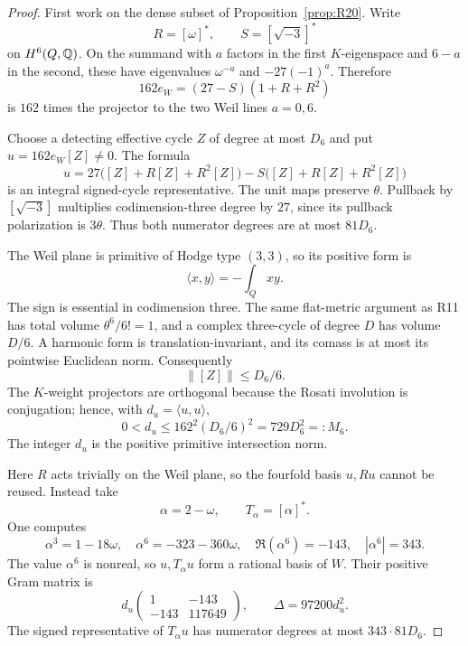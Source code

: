 \begin{proof}
First work on the dense subset of Proposition~\ref{prop:R20}. Write
\[
R=[\omega]^*,\qquad S=[\sqrt{-3}]^*
\]
on $H^6(Q,\mathbb Q)$. On the summand with $a$ factors in the first $K$-eigenspace and $6-a$ in the second, these have eigenvalues $\omega^{-a}$ and $-27(-1)^a$. Therefore
\begin{equation}
162e_W=(27-S)(1+R+R^2)
\label{eq:sixfold-projector}
\end{equation}
is $162$ times the projector to the two Weil lines $a=0,6$.

Choose a detecting effective cycle $Z$ of degree at most $D_6$ and put $u=162e_W[Z]\ne0$. The formula
\[
u=27\bigl([Z]+R[Z]+R^2[Z]\bigr)
-S\bigl([Z]+R[Z]+R^2[Z]\bigr)
\]
is an integral signed-cycle representative. The unit maps preserve $\theta$. Pullback by $[\sqrt{-3}]$ multiplies codimension-three degree by $27$, since its pullback polarization is $3\theta$. Thus both numerator degrees are at most $81D_6$.

The Weil plane is primitive of Hodge type $(3,3)$, so its positive form is
\[
\langle x,y\rangle=-\int_Qxy.
\]
The sign is essential in codimension three. The same flat-metric argument as R11 has total volume $\theta^6/6!=1$, and a complex three-cycle of degree $D$ has volume $D/6$. A harmonic form is translation-invariant, and its comass is at most its pointwise Euclidean norm. Consequently
\[
\|[Z]\|\leq D_6/6.
\]
The $K$-weight projectors are orthogonal because the Rosati involution is conjugation; hence, with $d_u=\langle u,u\rangle$,
\begin{equation}
0<d_u\leq162^2(D_6/6)^2=729D_6^2=:M_6.
\label{eq:M6}
\end{equation}
The integer $d_u$ is the positive primitive intersection norm.

Here $R$ acts trivially on the Weil plane, so the fourfold basis $u,Ru$ cannot be reused. Instead take
\[
\alpha=2-\omega,\qquad T_\alpha=[\alpha]^*.
\]
One computes
\[
\alpha^3=1-18\omega,\quad
\alpha^6=-323-360\omega,\quad
\Re(\alpha^6)=-143,\quad |\alpha^6|=343.
\]
The value $\alpha^6$ is nonreal, so $u,T_\alpha u$ form a rational basis of $W$. Their positive Gram matrix is
\[
d_u\begin{pmatrix}1&-143\\-143&117649\end{pmatrix},
\qquad \Delta=97200d_u^2.
\]
The signed representative of $T_\alpha u$ has numerator degrees at most $343\cdot81D_6$.


\end{proof}
